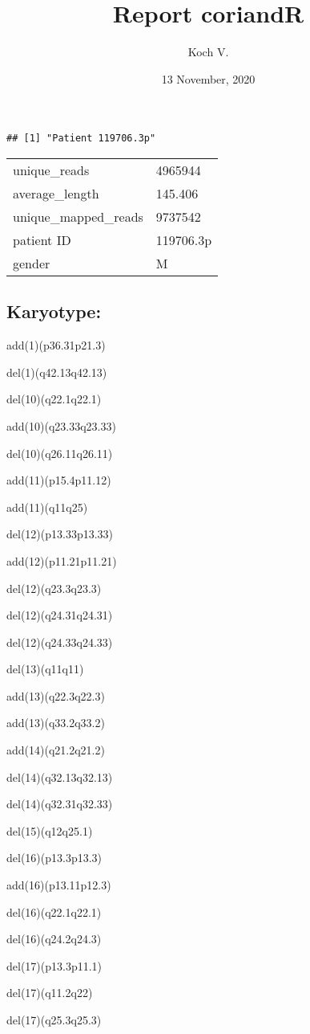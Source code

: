 \documentclass[]{article}
\title{Report coriandR}
\author{Koch V.}
\date{13 November, 2020}
\begin{document}
\maketitle

\begin{verbatim}
## [1] "Patient 119706.3p"
\end{verbatim}

\begin{longtable}[]{@{}ll@{}}
\toprule
\endhead
unique\_reads & 4965944\tabularnewline
average\_length & 145.406\tabularnewline
unique\_mapped\_reads & 9737542\tabularnewline
patient ID & 119706.3p\tabularnewline
gender & M\tabularnewline
\bottomrule
\end{longtable}

\hypertarget{karyotype}{%
\subsection{Karyotype:}\label{karyotype}}

add(1)(p36.31p21.3)

del(1)(q42.13q42.13)

del(10)(q22.1q22.1)

add(10)(q23.33q23.33)

del(10)(q26.11q26.11)

add(11)(p15.4p11.12)

add(11)(q11q25)

del(12)(p13.33p13.33)

add(12)(p11.21p11.21)

del(12)(q23.3q23.3)

del(12)(q24.31q24.31)

del(12)(q24.33q24.33)

del(13)(q11q11)

add(13)(q22.3q22.3)

add(13)(q33.2q33.2)

add(14)(q21.2q21.2)

del(14)(q32.13q32.13)

del(14)(q32.31q32.33)

del(15)(q12q25.1)

del(16)(p13.3p13.3)

add(16)(p13.11p12.3)

del(16)(q22.1q22.1)

del(16)(q24.2q24.3)

del(17)(p13.3p11.1)

del(17)(q11.2q22)

del(17)(q25.3q25.3)
\end{document}

